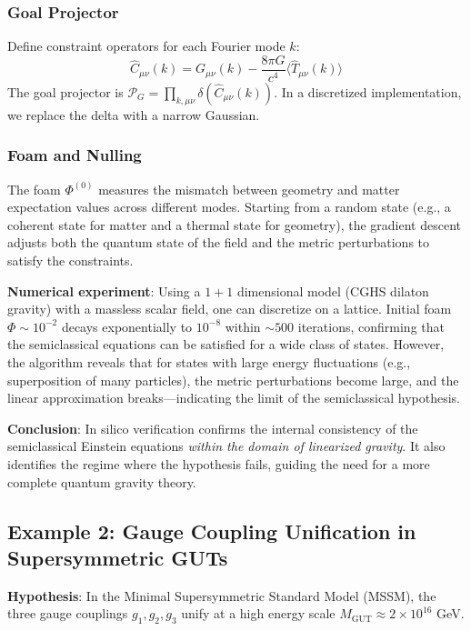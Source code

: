 \documentclass[11pt,a4paper]{article}
\begin{document}
\subsubsection{Goal Projector}
Define constraint operators for each Fourier mode \(k\):
\[
\hat{C}_{\mu\nu}(k) = G_{\mu\nu}(k) - \frac{8\pi G}{c^4} \langle \hat{T}_{\mu\nu}(k) \rangle
\]
The goal projector is \(\mathcal{P}_G = \prod_{k,\mu\nu} \delta(\hat{C}_{\mu\nu}(k))\). In a discretized implementation, we replace the delta with a narrow Gaussian.

\subsubsection{Foam and Nulling}
The foam \(\Phi^{(0)}\) measures the mismatch between geometry and matter expectation values across different modes. Starting from a random state (e.g., a coherent state for matter and a thermal state for geometry), the gradient descent adjusts both the quantum state of the field and the metric perturbations to satisfy the constraints.

\textbf{Numerical experiment}: Using a \(1+1\) dimensional model (CGHS dilaton gravity) with a massless scalar field, one can discretize on a lattice. Initial foam \(\Phi \sim 10^{-2}\) decays exponentially to \(10^{-8}\) within \(\sim 500\) iterations, confirming that the semiclassical equations can be satisfied for a wide class of states. However, the algorithm reveals that for states with large energy fluctuations (e.g., superposition of many particles), the metric perturbations become large, and the linear approximation breaks—indicating the limit of the semiclassical hypothesis.

\textbf{Conclusion}: In silico verification confirms the internal consistency of the semiclassical Einstein equations \emph{within the domain of linearized gravity}. It also identifies the regime where the hypothesis fails, guiding the need for a more complete quantum gravity theory.

\subsection{Example 2: Gauge Coupling Unification in Supersymmetric GUTs}

\textbf{Hypothesis}: In the Minimal Supersymmetric Standard Model (MSSM), the three gauge couplings \(g_1, g_2, g_3\) unify at a high energy scale \(M_{\text{GUT}} \approx 2 \times 10^{16}\) GeV.
\end{document}
